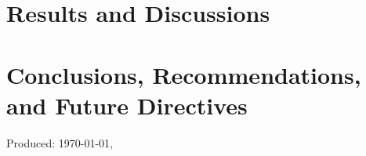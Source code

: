 \ifResultDiscuss 
	\chapter{Results and Discussions} 
	\label{ch:result_discuss} 
	\startcontents[chapters]
	\begin{SingleSpace}	
		\Mprintcontents 
	\end{SingleSpace}
	
	\stopcontents[chapters]
	\cleardoublepage
\fi

\ifConc
	\chapter{Conclusions, Recommendations, and Future Directives} 
	\label{ch:conc} 
	\startcontents[chapters]
	\begin{SingleSpace}	
		\Mprintcontents 
	\end{SingleSpace}
	
	\stopcontents[chapters]
	\cleardoublepage
\fi

\renewcommand{\UrlFont}{\normalfont}
\begin{SingleSpace}
  {\small }
	\vfill
		
		
		
	

\end{SingleSpace}
\vfill
\begin{flushright}
Produced: \usdate\today, \currenttime \\
\end{flushright}
\cleardoublepage 

